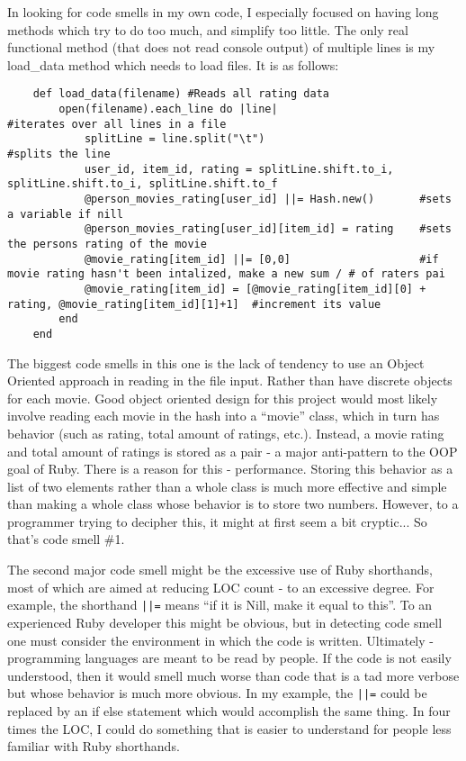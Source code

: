 	In looking for code smells in my own code, I especially focused on having long methods which try to do too much, and simplify too little. The only real functional method (that does not read console output) of multiple lines is my load\_data method which needs to load files. It is as follows:
	\begin{verbatim}
	def load_data(filename)	#Reads all rating data 
		open(filename).each_line do |line|						#iterates over all lines in a file
			splitLine = line.split("\t")						#splits the line
			user_id, item_id, rating = splitLine.shift.to_i, splitLine.shift.to_i, splitLine.shift.to_f
			@person_movies_rating[user_id] ||= Hash.new()		#sets a variable if nill
			@person_movies_rating[user_id][item_id] = rating	#sets the persons rating of the movie
			@movie_rating[item_id] ||= [0,0]					#if movie rating hasn't been intalized, make a new sum / # of raters pai
			@movie_rating[item_id] = [@movie_rating[item_id][0] + rating, @movie_rating[item_id][1]+1]	#increment its value
		end
	end
	\end{verbatim}

	The biggest code smells in this one is the lack of tendency to use an Object Oriented approach in reading in the file input. Rather than have discrete objects for each movie. Good object oriented design for this project would most likely involve reading each movie in the hash into a ``movie'' class, which in turn has behavior (such as rating, total amount of ratings, etc.). Instead, a movie rating and total amount of ratings is stored as a pair - a major anti-pattern to the OOP goal of Ruby. There is a reason for this - performance. Storing this behavior as a list of two elements rather than a whole class is much more effective and simple than making a whole class whose behavior is to store two numbers. However, to a programmer trying to decipher this, it might at first seem a bit cryptic... So that's code smell \#1.

	The second major code smell might be the excessive use of Ruby shorthands, most of which are aimed at reducing LOC count - to an excessive degree. For example, the shorthand \texttt{||=} means ``if it is Nill, make it equal to this''. To an experienced Ruby developer this might be obvious, but in detecting code smell one must consider the environment in which the code is written. Ultimately - programming languages are meant to be read by people. If the code is not easily understood, then it would smell much worse than code that is a tad more verbose but whose behavior is much more obvious. In my example, the \texttt{||=} could be replaced by an if else statement which would accomplish the same thing. In four times the LOC, I could do something that is easier to understand for people less familiar with Ruby shorthands.
	
	
